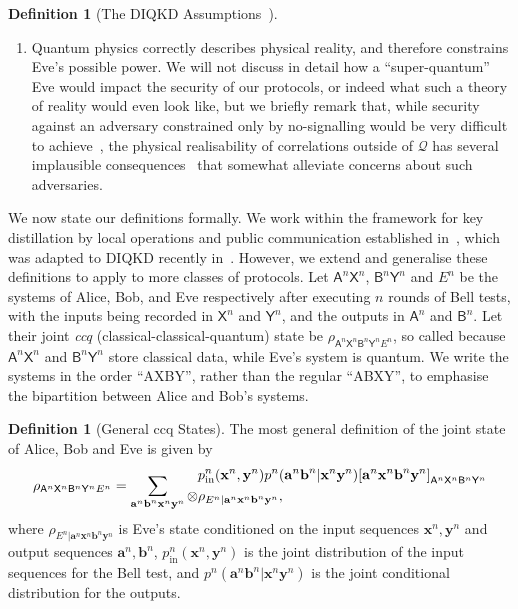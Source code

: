 \documentclass[10pt, a4paper]{article}
\numberwithin{equation}{section} %
\newcounter{stmt} %
\theoremstyle{definition}
\newtheorem{defn}[stmt]{Definition}
\theoremstyle{plain}
\newcommand{\restatableeq}[3]{\label{#3}#2\gdef#1{#2\tag{\ref{#3}}}} %
\newcommand{\?}{\mathrel{?}} %
\newcommand{\cvec}[1]{\boldsymbol{\mathbf{#1}}}    %
\newcommand{\crv}[1]{\mathsf{#1}}
\newcommand{\proj}[2][]{{[#2]}_{#1}}
\newcommand{\Qs}{\mathcal{Q}}
\newcommand{\prin}[1][p]{#1_{\mathrm{in}}}
\begin{document}
\begin{defn}[{The DIQKD Assumptions~\cite{DI_Proofs}}]
\begin{enumerate}
        \item Quantum physics correctly describes physical reality, and therefore constrains Eve's possible power. We will not discuss in detail how a ``super-quantum'' Eve would impact the security of our protocols, or indeed what such a theory of reality would even look like, but we briefly remark that, while security against an adversary constrained only by no-signalling would be very difficult to achieve~\cite{NSMemory, NSPAImpossible, ConsecutiveCKD}, the physical realisability of correlations outside of \(\Qs\) has several implausible consequences~\cite{ImplausibleConseq} that somewhat alleviate concerns about such adversaries.\label{assum:qcorrect}
      \end{enumerate}
    \end{defn}

    We now state our definitions formally. We work within the framework for key distillation by local operations and public communication established in~\cite{CQKeyDistill}, which was adapted to DIQKD recently in~\cite{DIQKD_Limits}. However, we extend and generalise these definitions to apply to more classes of protocols. Let \(\crv{A}^{n}\crv{X}^{n}\), \(\crv{B}^{n}\crv{Y}^{n}\) and \(E^n\) be the systems of Alice, Bob, and Eve respectively after executing \(n\) rounds of Bell tests, with the inputs being recorded in \(\crv{X}^{n}\) and \(\crv{Y}^{n}\), and the outputs in \(\crv{A}^{n}\) and \(\crv{B}^{n}\). Let their joint \emph{ccq} (classical-classical-quantum) state be \(\rho_{\crv{A}^n\crv{X}^n \crv{B}^n\crv{Y}^n E^n}\), so called because \(\crv{A}^n\crv{X}^n\) and \(\crv{B}^n\crv{Y}^n\) store classical data, while Eve's system is quantum. We write the systems in the order ``AXBY'', rather than the regular ``ABXY'', to emphasise the bipartition between Alice and Bob's systems.

    \begin{defn}[General ccq States]\label{def:ccq_belltest}
      The most general definition of the joint state of Alice, Bob and Eve is given by
      \begin{equation}
        \restatableeq{\bellccq}{
          \rho_{\crv{A}^n\crv{X}^n \crv{B}^n\crv{Y}^n E^n} = \sum_{\cvec{a}^n\cvec{b}^n \cvec{x}^n\cvec{y}^n} \begin{aligned}[c]
          & \prin^n(\cvec{x}^n,\cvec{y}^n) p^n(\cvec{a}^n\cvec{b}^n|\cvec{x}^n\cvec{y}^n) \proj[\crv{A}^n\crv{X}^n \crv{B}^n\crv{Y}^n]{\cvec{a}^n\cvec{x}^n \cvec{b}^n\cvec{y}^n} \\
            \otimes & \rho_{E^n|\cvec{a}^n\cvec{x}^n \cvec{b}^n\cvec{y}^n},
          \end{aligned}
        }{eqn:bellccq}
      \end{equation}
      where \(\rho_{E^n|\cvec{a}^n\cvec{x}^n \cvec{b}^n\cvec{y}^n}\) is Eve's state conditioned on the input sequences \(\cvec{x}^n, \cvec{y}^n\) and output sequences \(\cvec{a}^n, \cvec{b}^n\), \(\prin^n(\cvec{x}^n, \cvec{y}^n)\) is the joint distribution of the input sequences for the Bell test, and \(p^n(\cvec{a}^n \cvec{b}^n|\cvec{x}^n \cvec{y}^n)\) is the joint conditional distribution for the outputs.
    \end{defn}
\end{document}
